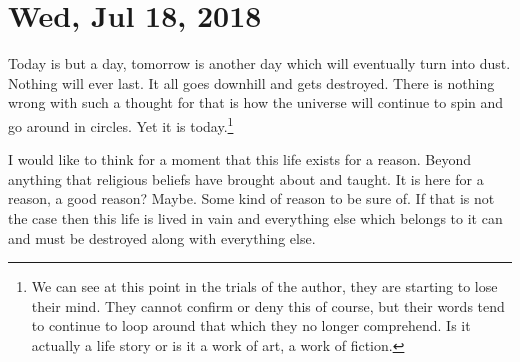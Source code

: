 \section{Wed, Jul 18, 2018}

Today is but a day, tomorrow is another day which will eventually turn into
dust. Nothing will ever last. It all goes downhill and gets destroyed. There is
nothing wrong with such a thought for that is how the universe will continue to
spin and go around in circles. Yet it is today.\footnote{
We can see at this point in the trials of the author, they are starting to lose
their mind. They cannot confirm or deny this of course, but their words tend to
continue to loop around that which they no longer comprehend. Is it actually a
life story or is it a work of art, a work of fiction.
}

I would like to think for a moment that this life exists for a reason. Beyond
anything that religious beliefs have brought about and taught. It is here for a
reason, a good reason? Maybe. Some kind of reason to be sure of. If that is not
the case then this life is lived in vain and everything else which belongs to it
can and must be destroyed along with everything else.
